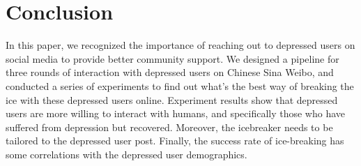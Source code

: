 \section{Conclusion}
In this paper, we recognized the importance of reaching out to depressed users on social media to provide better
community support. We designed a pipeline for three rounds of interaction with depressed users on Chinese Sina
Weibo, and conducted a series of experiments to find out what's the best way of breaking the ice with these depressed users online.
Experiment results show that depressed users are more willing to interact with humans, 
and specifically those who have suffered from depression but recovered. 
Moreover, the icebreaker needs to be tailored to the depressed user post. 
Finally, the success rate of ice-breaking has some correlations with the depressed user demographics.

